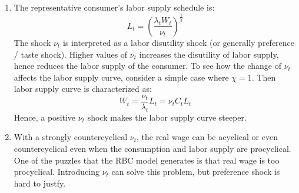 \documentclass[11pt]{amsart}
\begin{document}
\begin{enumerate}[label=(\alph*)]
	\item The representative consumer's labor supply schedule is: 
	\begin{equation*}
	L_t = \left( \frac{\lambda_t W_t}{\nu_t} \right)^{\frac{1}{\chi}}
	\end{equation*}
	The shock $\nu_t$ is interpreted as a labor disutility shock (or generally preference / taste shock). Higher values of $\nu_t$ increases the disutility of labor supply, hence reduces the labor supply of the consumer. To see how the change of $\nu_t$ affects the labor supply curve, consider a simple case where $\chi = 1$. Then labor supply curve is characterized as: 
	\begin{equation*}
	W_t = \frac{\nu_t}{\lambda_t} L_t = \nu_t C_t L_t  
	\end{equation*}
	Hence, a positive $\nu_t$ shock makes the labor supply curve steeper. 
	
	\item With a strongly countercyclical $\nu_t$, the real wage can be acyclical or even countercyclical even when the consumption and labor supply are procyclical. One of the puzzles that the RBC model generates is that real wage is too procyclical. Introducing $\nu_t$ can solve this problem, but preference shock is hard to justfy.  
\end{enumerate}
\end{document}
